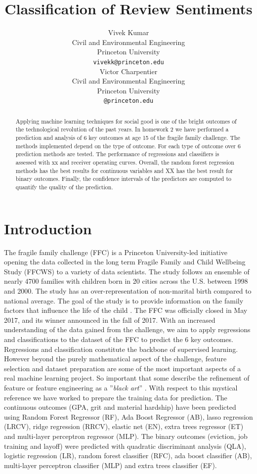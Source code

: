 \documentclass{article} %
\title{Classification of Review Sentiments}
\author{
Vivek Kumar\\
Civil and Environmental Engineering\\
Princeton University\\
\texttt{vivekk@princeton.edu} \\
\And
Victor Charpentier\\
Civil and Environmental Engineering\\
Princeton University\\
\texttt{@princeton.edu} \\
}
\begin{document}
\maketitle

\begin{abstract}
Applying machine learning techniques for social good is one of the bright outcomes of the technological revolution of the past years. In homework 2 we have performed a prediction and analysis of 6 key outcomes at age 15 of the fragile family challenge. The methods implemented depend on the type of outcome. For each type of outcome over 6 prediction methods are tested. The performance of regressions and classifiers is assessed with xx and receiver operating curves. Overall, the random forest regression methods has the best results for continuous variables and XX has the best result for binary outcomes. Finally, the confidence intervals of the predictors are computed to quantify the quality of the prediction.
\end{abstract}

\section{Introduction}
The fragile family challenge (FFC) is a Princeton University-led initiative opening the data collected in the long term Fragile Family and Child Wellbeing Study (FFCWS) to a variety of data scientists. The study follows an ensemble of nearly 4700 families with children born in 20 cities across the U.S. between 1998 and 2000. The study has an over-representation of non-marital birth compared to national average. The goal of the study is to provide information on the family factors that influence the life of the child  \cite{reichman2001fragile}. The FFC was officially closed in May 2017, and its winner announced in the fall of 2017. 
With an increased understanding of the data gained from the challenge, we aim to apply regressions and classifications to the dataset of the FFC to predict the 6 key outcomes. Regressions and classification constitute the backbone of supervised learning. However beyond the purely mathematical aspect of the challenge, feature selection and dataset preparation are some of the most important aspects of a real machine learning project. So important that some describe the refinement of feature or feature engineering as a ''\textit{black art}'' \cite{domingos2012few}. With respect to this mystical reference we have worked to prepare the training data for prediction. The continuous outcomes (GPA, grit and material hardship) have been predicted using Random Forest Regressor (RF), Ada Boost Regressor (AB), lasso regression (LRCV), ridge regression (RRCV), elastic net (EN), extra trees regressor (ET) and multi-layer perceptron regressor (MLP). The binary outcomes (eviction, job training and layoff) were predicted with quadratic discriminant analysis (QLA), logistic regression (LR), random forest classifier (RFC), ada boost classifier (AB),  multi-layer perceptron classifier (MLP) and extra trees classifier (EF).
\end{document}
